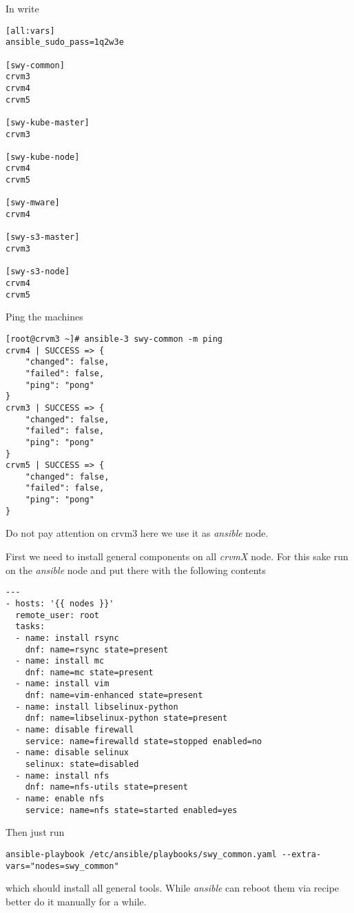 In  write

\begin{lstlisting}
[all:vars]
ansible_sudo_pass=1q2w3e

[swy-common]
crvm3
crvm4
crvm5

[swy-kube-master]
crvm3

[swy-kube-node]
crvm4
crvm5

[swy-mware]
crvm4

[swy-s3-master]
crvm3

[swy-s3-node]
crvm4
crvm5
\end{lstlisting}

Ping the machines

\begin{lstlisting}
[root@crvm3 ~]# ansible-3 swy-common -m ping
crvm4 | SUCCESS => {
    "changed": false,
    "failed": false,
    "ping": "pong"
}
crvm3 | SUCCESS => {
    "changed": false,
    "failed": false,
    "ping": "pong"
}
crvm5 | SUCCESS => {
    "changed": false,
    "failed": false,
    "ping": "pong"
}
\end{lstlisting}

Do not pay attention on crvm3 here we use it as \emph{ansible} node.

First we need to install general components on all \emph{crvmX} node.
For this sake run on the \emph{ansible}
node and put  there with the following contents

\begin{lstlisting}
---
- hosts: '{{ nodes }}'
  remote_user: root
  tasks:
  - name: install rsync
    dnf: name=rsync state=present
  - name: install mc
    dnf: name=mc state=present
  - name: install vim
    dnf: name=vim-enhanced state=present
  - name: install libselinux-python
    dnf: name=libselinux-python state=present
  - name: disable firewall
    service: name=firewalld state=stopped enabled=no
  - name: disable selinux
    selinux: state=disabled
  - name: install nfs
    dnf: name=nfs-utils state=present
  - name: enable nfs
    service: name=nfs state=started enabled=yes
\end{lstlisting}

Then just run

\begin{lstlisting}
ansible-playbook /etc/ansible/playbooks/swy_common.yaml --extra-vars="nodes=swy_common"
\end{lstlisting}

which should install all general tools. While \emph{ansible} can reboot them
via recipe better do it manually for a while.


